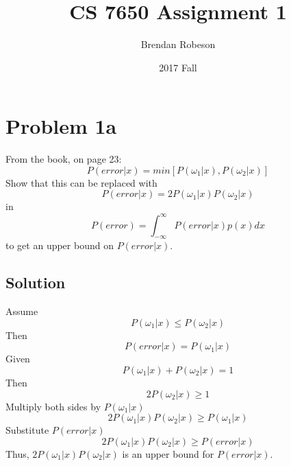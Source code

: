 \documentclass{IEEEtran}
\title{CS 7650 Assignment 1}
\author{Brendan Robeson}
\date{2017 Fall}
\begin{document}
\maketitle

\section{Problem 1a}
From the book, on page 23: \[P(error|x) = min[P(\omega_1|x),P(\omega_2|x)]\]
Show that this can be replaced with \[P(error|x) = 2P(\omega_1|x)P(\omega_2|x)\] in
\[P(error) = \int_{-\infty}^\infty P(error|x)p(x)dx\] to get an upper bound on \(P(error|x)\).
\subsection{Solution}
Assume \[P(\omega_1|x) \le P(\omega_2|x)\]
Then \[P(error|x) = P(\omega_1|x)\]
Given \[P(\omega_1|x) + P(\omega_2|x) = 1\]
Then \[2P(\omega_2|x) \ge 1\]
Multiply both sides by \(P(\omega_1|x)\) \[2P(\omega_1|x)P(\omega_2|x) \ge P(\omega_1|x)\]
Substitute \(P(error|x)\) \[2P(\omega_1|x)P(\omega_2|x) \ge P(error|x)\]
Thus, \(2P(\omega_1|x)P(\omega_2|x)\) is an upper bound for \(P(error|x)\).
\end{document}
